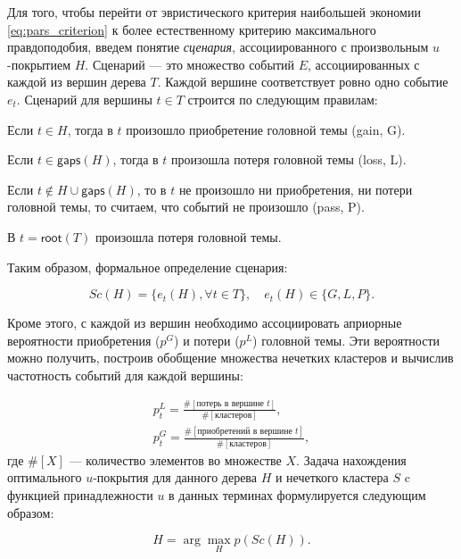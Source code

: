 \documentclass[12pt]{article}
\newenvironment{itemize*}%
{\begin{itemize}%
	\setlength{\itemsep}{0pt}%
	\setlength{\parskip}{0pt}}%
{\end{itemize}}
\let\smallcup\cup
\renewcommand{\cup}{\bigcup}
\begin{document}
Для того, чтобы перейти от эвристического критерия наибольшей экономии \eqref{eq:pars_criterion} к более естественному критерию максимального правдоподобия, введем понятие \textit{сценария}, ассоциированного с произвольным $u$-покрытием $H$. Сценарий --- это множество событий $E$, ассоциированных с каждой из вершин дерева $T$. Каждой вершине соответствует ровно одно событие $e_t$. Сценарий для вершины $t\in T$ строится по следующим правилам:

\begin{itemize*}
	\item Если $t\in H$, тогда  в $t$ произошло приобретение головной темы (gain, G).
	\item Если $t\in \textsf{gaps}(H)$, тогда в $t$ произошла потеря головной темы (loss, L).
	\item Если $t\notin H \smallcup \textsf{gaps}(H)$, то в $t$ не произошло ни приобретения, ни потери головной темы, то считаем, что событий не произошло (pass, P).
	\item В $t=\textsf{root}(T)$ произошла потеря головной темы.
\end{itemize*}
Таким образом, формальное определение сценария:

\begin{equation}
	Sc(H) = \{e_t(H),\forall t\in T\}, \quad e_t(H) \in \{G, L, P\}.
\end{equation}

Кроме этого, с каждой из вершин необходимо ассоциировать априорные вероятности приобретения ($p^G$) и потери ($p^L$) головной темы. Эти вероятности можно получить, построив обобщение множества нечетких кластеров и вычислив частотность событий для каждой вершины:

\begin{equation}
	\begin{gathered}
		p_t^L = \frac{\#[\text{потерь в вершине }t]}{\#[\text{кластеров}]}, \\
		p_t^G = \frac{\#[\text{приобретений в вершине }t]}{\#[\text{кластеров}]},
	\end{gathered}
	\label{eq:loss_gain_freq}
\end{equation}
где $\#[X]$ --- количество элементов во множестве $X$. Задача нахождения оптимального $u$-покрытия для данного дерева $H$ и нечеткого кластера $S$ c функцией принадлежности $u$ в данных терминах формулируется следующим образом:

\begin{equation}
	H = \arg\max_H p(Sc(H)).
\end{equation}
\end{document}
